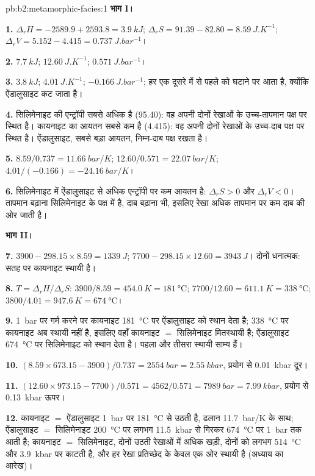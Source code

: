 \begin{solution}{pb:b2:metamorphic-facies:1}
\noindent\textbf{भाग I।}

\textbf{1.} $\Delta_r H = -2589.9 + 2593.8 = \qty{3.9}{kJ}$; $\Delta_r S = 91.39 - 82.80 =
\qty{8.59}{J.K^{-1}}$; $\Delta_r V = 5.152 - 4.415 = \qty{0.737}{J.bar^{-1}}$।

\textbf{2.} $\qty{7.7}{kJ}$; $\qty{12.60}{J.K^{-1}}$; $\qty{0.571}{J.bar^{-1}}$।

\textbf{3.} $\qty{3.8}{kJ}$; $\qty{4.01}{J.K^{-1}}$; $\qty{-0.166}{J.bar^{-1}}$; हर एक
दूसरे में से पहले को घटाने पर आता है, क्योंकि ऐंडालुसाइट कट जाता है।

\textbf{4.} सिलिमेनाइट की एन्ट्रॉपी सबसे अधिक है (95.40): वह अपनी दोनों रेखाओं के उच्च-तापमान
पक्ष पर स्थित है। कायनाइट का आयतन सबसे कम है (4.415): वह अपनी दोनों रेखाओं के
उच्च-दाब पक्ष पर स्थित है। ऐंडालुसाइट, सबसे बड़ा आयतन, निम्न-दाब
पक्ष रखता है।

\textbf{5.} $8.59/0.737 = \qty{11.66}{bar/K}$; $12.60/0.571 = \qty{22.07}{bar/K}$;
$4.01/(-0.166) = \qty{-24.16}{bar/K}$।

\textbf{6.} सिलिमेनाइट में ऐंडालुसाइट से अधिक एन्ट्रॉपी पर कम आयतन है: $\Delta_r S > 0$
और $\Delta_r V < 0$। तापमान बढ़ाना सिलिमेनाइट के पक्ष में है, दाब बढ़ाना
भी, इसलिए रेखा अधिक तापमान पर कम दाब की ओर जाती है।

\noindent\textbf{भाग II।}

\textbf{7.} $3900 - 298.15\times8.59 = \qty{+1339}{J}$; $7700 - 298.15\times12.60 =
\qty{+3943}{J}$। दोनों धनात्मक: सतह पर कायनाइट स्थायी है।

\textbf{8.} $T = \Delta_r H/\Delta_r S$: $3900/8.59 = \qty{454.0}{K} = \qty{181}{\celsius}$;
$7700/12.60 = \qty{611.1}{K} = \qty{338}{\celsius}$; $3800/4.01 = \qty{947.6}{K} =
\qty{674}{\celsius}$।

\textbf{9.} \qty{1}{bar} पर गर्म करने पर कायनाइट \qty{181}{\celsius} पर ऐंडालुसाइट को
स्थान देता है; \qty{338}{\celsius} पर कायनाइट अब स्थायी नहीं है, इसलिए वहाँ कायनाइट $=$
सिलिमेनाइट मितस्थायी है; ऐंडालुसाइट \qty{674}{\celsius} पर सिलिमेनाइट को स्थान
देता है। पहला और तीसरा स्थायी साम्य हैं।

\textbf{10.} $(8.59\times673.15 - 3900)/0.737 = \qty{2554}{bar} = \qty{2.55}{kbar}$,
प्रयोग से \qty{0.01}{kbar} दूर।

\textbf{11.} $(12.60\times973.15 - 7700)/0.571 = 4562/0.571 = \qty{7989}{bar} =
\qty{7.99}{kbar}$, प्रयोग से \qty{0.13}{kbar} ऊपर।

\textbf{12.} कायनाइट $=$ ऐंडालुसाइट \qty{1}{bar} पर \qty{181}{\celsius} से उठती है, ढलान
\qty{11.7}{bar/K} के साथ; ऐंडालुसाइट $=$ सिलिमेनाइट \qty{200}{\celsius} पर लगभग \qty{11.5}{kbar} से
गिरकर \qty{674}{\celsius} पर \qty{1}{bar} तक आती है; कायनाइट $=$ सिलिमेनाइट, दोनों उठती रेखाओं में
अधिक खड़ी, दोनों को लगभग \qty{514}{\celsius} और \qty{3.9}{kbar} पर काटती है, और हर रेखा प्रतिच्छेद के केवल
एक ओर स्थायी है (अध्याय का आरेख)।


\end{solution}

